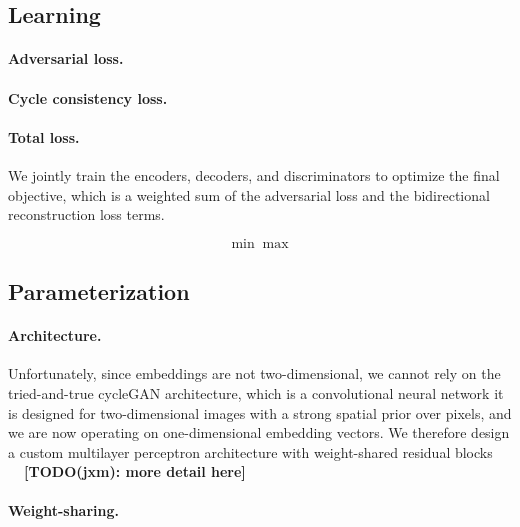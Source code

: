 \documentclass{article}
\begin{document}
\subsection{Learning}


\paragraph{Adversarial loss.}


\paragraph{Cycle consistency loss.}



\paragraph{Total loss.} We jointly train the encoders, decoders, and discriminators to optimize the final objective, which is a weighted sum of the adversarial loss and the
bidirectional reconstruction loss terms.


\[
\min \max
\]

\subsection{Parameterization}


\paragraph{Architecture.} Unfortunately, since embeddings are not two-dimensional, we cannot rely on the tried-and-true cycleGAN architecture, which is a convolutional neural network it is designed for two-dimensional images with a strong spatial prior over pixels, and we are now operating on one-dimensional embedding vectors. We therefore design a custom multilayer perceptron architecture with weight-shared residual blocks \textbf{\color{purple}\ \ [TODO(jxm): more detail here]}

\paragraph{Weight-sharing.}
\end{document}
